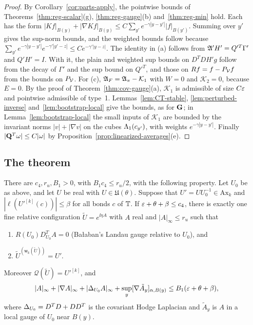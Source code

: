 \begin{proof}
By Corollary~\ref{cor:parts-apply}, the pointwise bounds of Theorems~\ref{thm:reg-scalar}(g), \ref{thm:reg-gauge}(b) and~\ref{thm:reg-min} hold. Each has the form $|Kf|_{B(y)}+|\nabla Kf|_{B(y)}\le C\sum_{y'}e^{-\gamma|y-y'|}|f|_{B(y')}$. Summing over $y'$ gives the sup-norm bounds, and the weighted bounds follow because $\sum_{y'}e^{-\gamma|y-y'|}e^{-\gamma'|y'-z|}\le Ce^{-\gamma'|y-z|}$. The identity in (a) follows from $\mathfrak A'H'=Q'^T\Gamma'$ and $Q'H'=I$. With it, the plain and weighted sup bounds on $D^TDH'g$ follow from the decay of $\Gamma'$ and the sup bound on $Q'^T$, and those on $Rf=f-P_\mathcal V f$ from the bounds on $P_\mathcal V$. For (c), $\mathfrak A_F=\mathfrak A_\pi-\mathcal K_1$ with $W=0$ and $\mathcal K_2=0$, because $E=0$. By the proof of Theorem~\ref{thm:cov-gauge}(a), $\mathcal K_1$ is admissible of size $C\varepsilon$ and pointwise admissible of type~1. Lemmas~\ref{lem:CT-stable}, \ref{lem:perturbed-inverse} and~\ref{lem:bootstrap-local} give the bounds, as for $\mathbf G$; in Lemma~\ref{lem:bootstrap-local} the small inputs of $\mathcal K_1$ are bounded by the invariant norms $|v|+|\nabla v|$ on the cubes $\Lambda_1(c_{y'})$, with weights $e^{-\gamma|y-y'|}$. Finally $|\mathbf Q^T\omega|\le C|\omega|$ by Proposition~\ref{prop:linearized-averages}(e).
\end{proof}

\subsection{The theorem}

\begin{theorem}\label{thm:chart}
There are $c_4,r_u,B_1>0$, with $B_1c_4\le r_u/2$, with the following property. Let $U_0$ be as above, and let $U$ be real with $U\in\mathfrak U(\theta)$. Suppose that $U'=UU_0^{-1}\in\mathrm{Ax}_k$ and $|\ell(U'^{[k]}(c))|\le\beta$ for all bonds $c$ of $\mathbb T$. If $\varepsilon+\theta+\beta\le c_4$, there is exactly one fine relative configuration $\tilde U=e^{\ii\eta A}$ with $A$ real and $|A|_\infty\le r_u$ such that
\begin{enumerate}[label=(\roman*)]
\item $R(U_0)D^T_{U_0}A=0$ (Ba\l aban's Landau gauge relative to $U_0$), and
\item $\tilde U^{(\mathsf w_k(\tilde U))}=U'$.
\end{enumerate}
Moreover $\mathcal Q(\tilde U)=U'^{[k]}$, and
\[
|A|_\infty+|\nabla A|_\infty+|\Delta_{U_0}A|_\infty+\sup_y[\nabla\tilde A_y]_{\alpha,B(y)}\le B_1(\varepsilon+\theta+\beta),
\]
where $\Delta_{U_0}=D^TD+DD^T$ is the covariant Hodge Laplacian and $\tilde A_y$ is $A$ in a local gauge of $U_0$ near $B(y)$.
\end{theorem}

